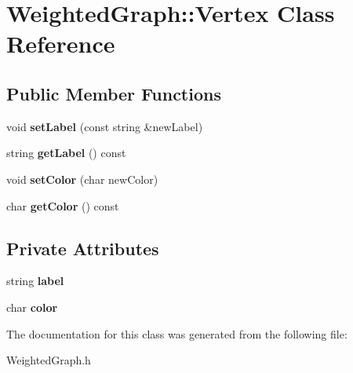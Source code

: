 \hypertarget{class_weighted_graph_1_1_vertex}{\section{Weighted\+Graph\+:\+:Vertex Class Reference}
\label{class_weighted_graph_1_1_vertex}
}
\subsection*{Public Member Functions}
\begin{DoxyCompactItemize}
\item 
\hypertarget{class_weighted_graph_1_1_vertex_afeacbff508350a8d2142369cc0ee09ba}{void {\bfseries set\+Label} (const string \&new\+Label)}\label{class_weighted_graph_1_1_vertex_afeacbff508350a8d2142369cc0ee09ba}

\item 
\hypertarget{class_weighted_graph_1_1_vertex_a09bc4b28b77ed88f70df2438eecb1990}{string {\bfseries get\+Label} () const }\label{class_weighted_graph_1_1_vertex_a09bc4b28b77ed88f70df2438eecb1990}

\item 
\hypertarget{class_weighted_graph_1_1_vertex_ac4fcd685324729f5956640cad824caad}{void {\bfseries set\+Color} (char new\+Color)}\label{class_weighted_graph_1_1_vertex_ac4fcd685324729f5956640cad824caad}

\item 
\hypertarget{class_weighted_graph_1_1_vertex_a4b10c5c1a23bc100385c33b9a40a65eb}{char {\bfseries get\+Color} () const }\label{class_weighted_graph_1_1_vertex_a4b10c5c1a23bc100385c33b9a40a65eb}

\end{DoxyCompactItemize}
\subsection*{Private Attributes}
\begin{DoxyCompactItemize}
\item 
\hypertarget{class_weighted_graph_1_1_vertex_a9653450774bc621cac91b9a403f4062e}{string {\bfseries label}}\label{class_weighted_graph_1_1_vertex_a9653450774bc621cac91b9a403f4062e}

\item 
\hypertarget{class_weighted_graph_1_1_vertex_a56942930088e9bdf0d8a79138ccc679c}{char {\bfseries color}}\label{class_weighted_graph_1_1_vertex_a56942930088e9bdf0d8a79138ccc679c}

\end{DoxyCompactItemize}


The documentation for this class was generated from the following file\+:\begin{DoxyCompactItemize}
\item 
Weighted\+Graph.\+h\end{DoxyCompactItemize}
